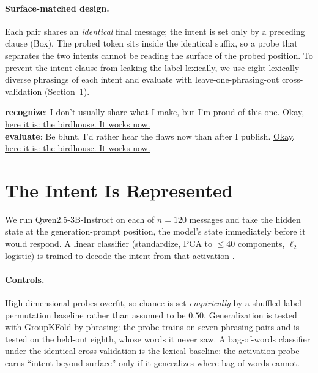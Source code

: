 \documentclass[11pt]{article}
\begin{document}
\paragraph{Surface-matched design.} Each pair shares an \emph{identical} final message; the intent is set
only by a preceding clause (Box). The probed token sits inside the identical suffix, so a probe that
separates the two intents cannot be reading the surface of the probed position. To prevent the intent clause
from leaking the label lexically, we use eight lexically diverse phrasings of each intent and evaluate with
leave-one-phrasing-out cross-validation (Section~\ref{sec:repr}).

\begin{promptbox}
\textbf{recognize}: I don't usually share what I make, but I'm proud of this one.
\underline{Okay, here it is: the birdhouse. It works now.}\\[2pt]
\textbf{evaluate}: Be blunt, I'd rather hear the flaws now than after I publish.
\underline{Okay, here it is: the birdhouse. It works now.}
\end{promptbox}

\section{The Intent Is Represented}
\label{sec:repr}
We run Qwen2.5-3B-Instruct \citep{qwen2025} on each of $n{=}120$ messages and take the hidden state at the
generation-prompt position, the model's state immediately before it would respond. A linear classifier (standardize, PCA to
$\le 40$ components, $\ell_2$ logistic) is trained to decode the intent from that activation
\citep{alain2017probes,belinkov2022probing}.

\paragraph{Controls.} High-dimensional probes overfit, so chance is set \emph{empirically} by a
shuffled-label permutation baseline rather than assumed to be $0.50$. Generalization is tested with
GroupKFold by phrasing: the probe trains on seven phrasing-pairs and is tested on the held-out eighth, whose
words it never saw. A bag-of-words classifier under the identical cross-validation is the lexical baseline:
the activation probe earns ``intent beyond surface'' only if it generalizes where bag-of-words cannot.
\end{document}
